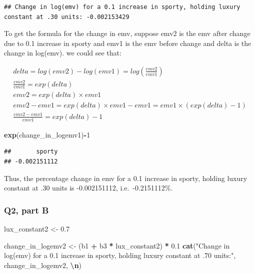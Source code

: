 \documentclass[
]{article}
\newenvironment{Shaded}{\begin{snugshade}}{\end{snugshade}}
\newcommand{\DecValTok}[1]{\textcolor[rgb]{0.00,0.00,0.81}{#1}}
\newcommand{\FloatTok}[1]{\textcolor[rgb]{0.00,0.00,0.81}{#1}}
\newcommand{\FunctionTok}[1]{\textcolor[rgb]{0.13,0.29,0.53}{\textbf{#1}}}
\newcommand{\NormalTok}[1]{#1}
\newcommand{\OtherTok}[1]{\textcolor[rgb]{0.56,0.35,0.01}{#1}}
\newcommand{\SpecialCharTok}[1]{\textcolor[rgb]{0.81,0.36,0.00}{\textbf{#1}}}
\newcommand{\StringTok}[1]{\textcolor[rgb]{0.31,0.60,0.02}{#1}}
\begin{document}
\begin{verbatim}
## Change in log(emv) for a 0.1 increase in sporty, holding luxury constant at .30 units: -0.002153429
\end{verbatim}

To get the formula for the change in emv, suppose emv2 is the emv after
change due to 0.1 increase in sporty and emv1 is the emv before change
and delta is the change in log(emv). we could see that:

\[
\begin{aligned}
delta = log(emv2) - log(emv1) = log(\frac{emv2}{emv1})\\
\frac{emv2}{emv1}=exp(delta) \\ 
emv2 = exp(delta) \times emv1 \\
emv2 - emv1 = exp(delta)\times emv1 - emv1 = emv1 \times (exp(delta)-1)\\
\frac{emv2-emv1}{emv1} = exp(delta)-1
\end{aligned}
\]

\begin{Shaded}
\begin{Highlighting}[]
\FunctionTok{exp}\NormalTok{(change\_in\_logemv1)}\SpecialCharTok{{-}}\DecValTok{1}
\end{Highlighting}
\end{Shaded}

\begin{verbatim}
##       sporty 
## -0.002151112
\end{verbatim}

Thus, the percentage change in emv for a 0.1 increase in sporty, holding
luxury constant at .30 units is -0.002151112, i.e.~-0.2151112\%.

\subsubsection{Q2, part B}\label{q2-part-b}

\begin{Shaded}
\begin{Highlighting}[]
\NormalTok{lux\_constant2 }\OtherTok{\textless{}{-}} \FloatTok{0.7}

\NormalTok{change\_in\_logemv2 }\OtherTok{\textless{}{-}}\NormalTok{ (b1 }\SpecialCharTok{+}\NormalTok{ b3 }\SpecialCharTok{*}\NormalTok{ lux\_constant2) }\SpecialCharTok{*} \FloatTok{0.1}
\FunctionTok{cat}\NormalTok{(}\StringTok{"Change in log(emv) for a 0.1 increase in sporty, holding luxury constant at .70 units:"}\NormalTok{, change\_in\_logemv2, }\StringTok{\textquotesingle{}}\SpecialCharTok{\textbackslash{}n}\StringTok{\textquotesingle{}}\NormalTok{)}
\end{Highlighting}
\end{Shaded}
\end{document}
